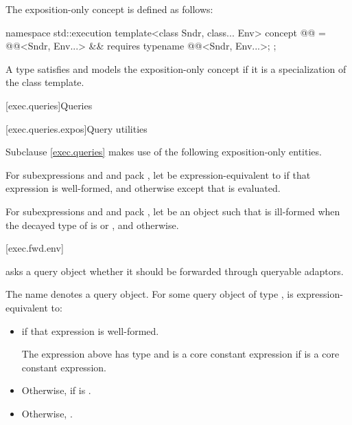 \pnum
The exposition-only concept  is defined as follows:
\begin{codeblock}
namespace std::execution {
  template<class Sndr, class... Env>
    concept @@ = @@<Sndr, Env...> &&
      requires {
        typename @@<Sndr, Env...>;
      };
}
\end{codeblock}

\pnum
A type satisfies and models the exposition-only concept
 if
it is a specialization of the  class template.

[exec.queries]{Queries}

[exec.queries.expos]{Query utilities}

\pnum
Subclause \ref{exec.queries} makes use of the following exposition-only entities.

\pnum
For subexpressions  and  and pack ,
let  be expression-equivalent to
if that expression is well-formed, and
 otherwise
except that  is evaluated.

\pnum
For subexpressions  and  and pack ,
let  be an object  such that
 is ill-formed when the decayed type of  is
 or , and
 otherwise.

[exec.fwd.env]{}

\pnum
{} asks a query object
whether it should be forwarded through queryable adaptors.

\pnum
The name  denotes a query object.
For some query object  of type ,
 is expression-equivalent to:
\begin{itemize}
\item
{}
if that expression is well-formed.

\mandates
The expression above has type  and
is a core constant expression if  is a core constant expression.
\item
Otherwise,  if  is .
\item
Otherwise, .
\end{itemize}

